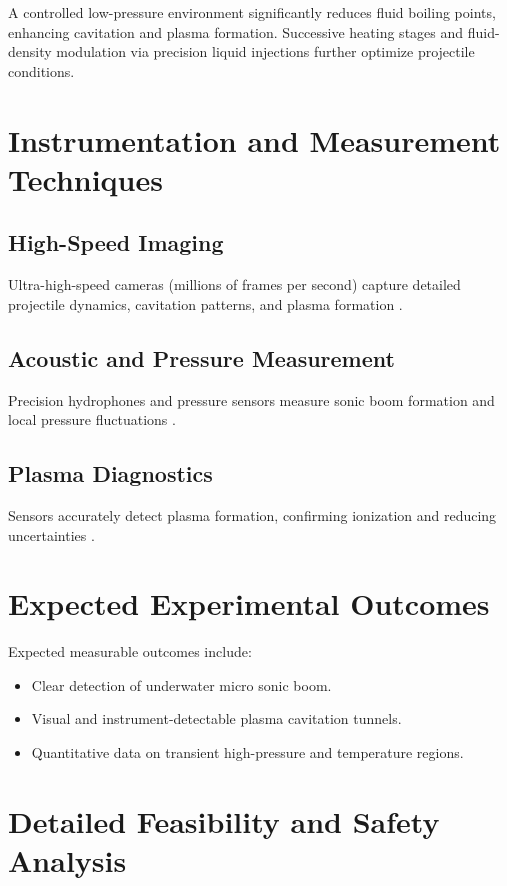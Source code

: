 \documentclass{article}
\begin{document}
A controlled low-pressure environment significantly reduces fluid boiling points, enhancing cavitation and plasma formation. Successive heating stages and fluid-density modulation via precision liquid injections further optimize projectile conditions.

\section{Instrumentation and Measurement Techniques}

\subsection{High-Speed Imaging}

Ultra-high-speed cameras (millions of frames per second) capture detailed projectile dynamics, cavitation patterns, and plasma formation \cite{settles2001schlieren}.

\subsection{Acoustic and Pressure Measurement}

Precision hydrophones and pressure sensors measure sonic boom formation and local pressure fluctuations \cite{urick1983principles}.

\subsection{Plasma Diagnostics}

Sensors accurately detect plasma formation, confirming ionization and reducing uncertainties \cite{raizer1997gas}.

\section{Expected Experimental Outcomes}

Expected measurable outcomes include:
\begin{itemize}
\item Clear detection of underwater micro sonic boom.
\item Visual and instrument-detectable plasma cavitation tunnels.
\item Quantitative data on transient high-pressure and temperature regions.
\end{itemize}

\section{Detailed Feasibility and Safety Analysis}
\end{document}
